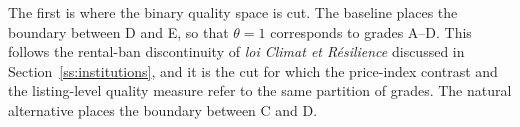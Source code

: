 The first is where the binary quality space is cut. The baseline places the boundary between
D and E, so that $\theta=1$ corresponds to grades A--D. This follows the rental-ban
discontinuity of \emph{loi Climat et R\'esilience} discussed in
Section~\ref{ss:institutions}, and it is the cut for which the price-index contrast and the
listing-level quality measure refer to the same partition of grades. The natural alternative
places the boundary between C and D.
